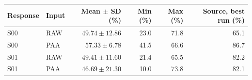 \begin{tabular}{llrrrr}
\toprule
Response & Input & Mean $\pm$ SD (\%) & Min (\%) & Max (\%) & Source, best run (\%) \\
\midrule
S00 & RAW & $49.74 \pm 12.86$ & 23.0 & 71.8 & 65.1 \\
S00 & PAA & $57.33 \pm 6.78$ & 41.5 & 66.6 & 86.7 \\
S01 & RAW & $49.41 \pm 11.60$ & 21.4 & 65.5 & 82.2 \\
S01 & PAA & $46.69 \pm 21.30$ & 10.0 & 73.8 & 82.1 \\
\bottomrule
\end{tabular}
